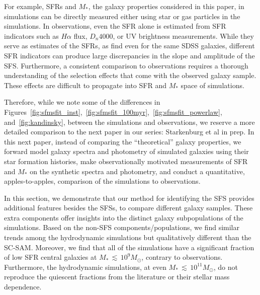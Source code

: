 \documentclass[tighten, preprint]{aastex62}
\begin{document}
{For example, SFRs and $M_*$, the galaxy properties considered in this paper, 
in simulations can be directly measured either using star or gas particles in 
the simulations. In observations, even the SFR alone is estimated from SFR indicators 
such as $H\alpha$ flux, $D_n 4000$, or UV brightness measurements. 
While they serve as estimates of the SFRs, as \cite{speagle2014} find even 
for the same SDSS galaxies, different SFR indicators can produce large 
discrepancies in the slope and amplitude of the SFS. Furthermore, a 
consistent comparison to observations requires a thorough understanding of 
the selection effects that come with the observed galaxy sample. These 
effects are difficult to propagate into SFR and $M_*$ space of simulations. 


Therefore, while we note some of the differences in 
Figures~\ref{fig:sfmsfit_inst},~\ref{fig:sfmsfit_100myr},~\ref{fig:sfmsfit_powerlaw}, 
and~\ref{fig:kandinsky}, between the simulations and observations,  
we reserve a more detailed comparison to the next paper in our 
series: Starkenburg et al in prep. In this next paper, instead of
comparing the ``theoretical'' galaxy properties, we forward model galaxy 
spectra and photometry of simulated galaxies using their star formation 
histories, make observationally motivated measurements of SFR and $M_*$ on
the synthetic spectra and photometry, and conduct a quantitative, 
apples-to-apples, comparison of the simulations to observations.}

In this section, we demonstrate that our method for identifying the SFS
provides additional features besides the SFSs, to compare different galaxy 
samples. These extra components offer insights into the 
distinct galaxy subpopulations of the simulations. Based on the non-SFS 
components/populations, we find 
{\color{red}  similar trends among the hydrodynamic simulations but 
qualitatively different than} 
the SC-SAM. Moreover, we find that all of the simulations have a significant
fraction of low SFR central galaxies at $M_*\,{\lesssim}\,10^9M_\odot$, 
contrary to observations. Furthermore, the hydrodynamic simulations, at 
even $M_*\,{\lesssim}\,10^{11}M_\odot$, do not reproduce the quiescent 
fractions from the literature or their stellar mass dependence. 
\end{document}
